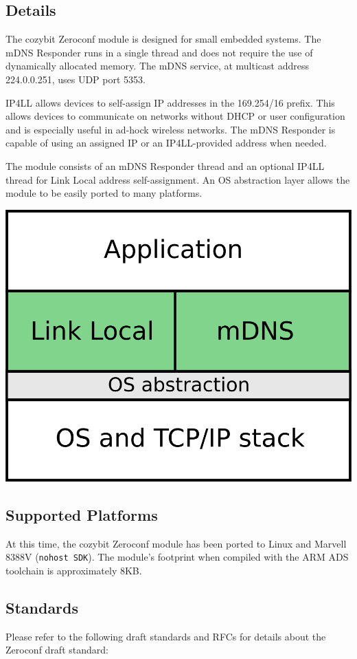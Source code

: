 \documentclass[12pt,landscape,twocolumn]{article}
\begin{document}
\subsection*{Details}

The cozybit Zeroconf module is designed for small embedded systems.  The mDNS 
Responder runs in a single thread and does not require the use of dynamically 
allocated memory.  The mDNS service, at multicast address 224.0.0.251, uses 
UDP port 5353.

IP4LL allows devices to self-assign IP addresses in the 169.254/16 prefix. 
This allows devices to communicate on networks without DHCP or user 
configuration and is especially useful in ad-hock wireless networks.  The mDNS
Responder is capable of using an assigned IP or an IP4LL-provided address when
needed.

The module consists of an mDNS Responder thread and an optional IP4LL thread 
for Link Local address self-assignment.  An OS abstraction layer allows the 
module to be easily ported to many platforms.

\begin{center}
\includegraphics[width=40ex]{./figures/arch.png}
\end{center}

\subsection*{Supported Platforms}

At this time, the cozybit Zeroconf module has been ported to Linux and
Marvell 8388V ({\tt nohost SDK}).  The module's footprint when compiled with
the ARM ADS toolchain is approximately 8KB.

\pagebreak
\subsection*{Standards}

Please refer to the following draft standards and RFCs for details about the
Zeroconf draft standard:
\end{document}
